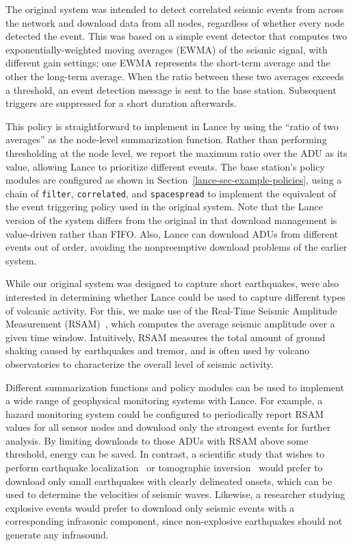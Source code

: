 The original system was intended to detect correlated seismic events from
across the network and download data from all nodes, regardless of whether
every node detected the event. This was based on a simple event detector that
computes two exponentially-weighted moving averages (EWMA) of the seismic
signal, with different gain settings; one EWMA represents the short-term
average and the other the long-term average. When the ratio between these two
averages exceeds a threshold, an event detection message is sent to the base
station. Subsequent triggers are suppressed for a short duration afterwards.

This policy is straightforward to implement in Lance by using the ``ratio of
two averages'' as the node-level summarization function. Rather than
performing thresholding at the node level, we report the maximum ratio over
the ADU as its value, allowing Lance to prioritize different events. The base
station's policy modules are configured as shown in
Section~\ref{lance-sec-example-policies}, using a chain of \texttt{filter},
{\tt correlated}, and \texttt{spacespread} to implement the equivalent of the
event triggering policy used in the original system. Note that the Lance
version of the system differs from the original in that download management
is value-driven rather than FIFO. Also, Lance can download ADUs from
different events out of order, avoiding the nonpreemptive download problems
of the earlier system.

While our original system was designed to capture short earthquakes, were
also interested in determining whether Lance could be used to capture
different types of volcanic activity. For this, we make use of the Real-Time
Seismic Amplitude Measurement (RSAM)~\cite{rsam}, which computes the average
seismic amplitude over a given time window. Intuitively, RSAM measures the
total amount of ground shaking caused by earthquakes and tremor, and is often
used by volcano observatories to characterize the overall level of seismic
activity.

Different summarization functions and policy modules can be used to implement
a wide range of geophysical monitoring systems with Lance. For example, a
hazard monitoring system could be configured to periodically report RSAM
values for all sensor nodes and download only the strongest events for
further analysis. By limiting downloads to those ADUs with RSAM above some
threshold, energy can be saved. In contrast, a scientific study that wishes
to perform earthquake localization~\cite{aki-richards-80} or tomographic
inversion~\cite{lees-lindley-94} would prefer to download only small
earthquakes with clearly delineated onsets, which can be used to determine
the velocities of seismic waves. Likewise, a researcher studying explosive
events would prefer to download only seismic events with a corresponding
infrasonic component, since non-explosive earthquakes should not generate any
infrasound.

